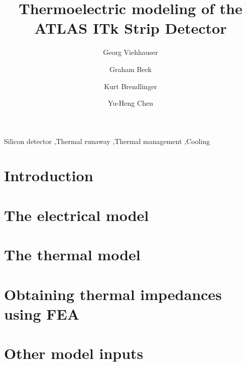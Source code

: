 \documentclass[preprint]{elsarticle/elsarticle}
\begin{document}
\begin{frontmatter}

\title{Thermoelectric modeling of the ATLAS ITk Strip Detector}
\author[1]{Georg Viehhauser} %
\author[2]{Graham Beck}      %
\author[3]{Kurt Brendlinger} %
\author[3]{Yu-Heng Chen}     %

\address[1]{Oxford University, Oxford, England, UK}
\address[2]{Queen Mary University of London, London, UK}
\address[3]{Deutsches Elektronen-Synchrotron DESY, Notkestra{\ss}e 85, 22607 Hamburg}

\begin{abstract}

\end{abstract}

\begin{keyword}
Silicon detector \sep Thermal runaway \sep Thermal management \sep Cooling
\end{keyword}

\end{frontmatter}

\section{Introduction}


\section{The electrical model}


\section{The thermal model}


\section{Obtaining thermal impedances using FEA}


\section{Other model inputs}

\end{document}
